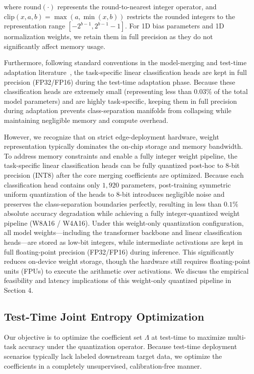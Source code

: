 where $\text{round}(\cdot)$ represents the round-to-nearest integer operator, and $\text{clip}(x, a, b) = \max(a, \min(x, b))$ restricts the rounded integers to the representation range $[-2^{b-1}, 2^{b-1}-1]$. For 1D bias parameters and 1D normalization weights, we retain them in full precision as they do not significantly affect memory usage.

Furthermore, following standard conventions in the model-merging and test-time adaptation literature~\cite{ilharco2022editing, yang2024adamerging}, the task-specific linear classification heads are kept in full precision (FP32/FP16) during the test-time adaptation phase. Because these classification heads are extremely small (representing less than 0.03\% of the total model parameters) and are highly task-specific, keeping them in full precision during adaptation prevents class-separation manifolds from collapsing while maintaining negligible memory and compute overhead. 

However, we recognize that on strict edge-deployment hardware, weight representation typically dominates the on-chip storage and memory bandwidth. To address memory constraints and enable a fully integer weight pipeline, the task-specific linear classification heads can be fully quantized post-hoc to 8-bit precision (INT8) after the core merging coefficients are optimized. Because each classification head contains only $1,920$ parameters, post-training symmetric uniform quantization of the heads to 8-bit introduces negligible noise and preserves the class-separation boundaries perfectly, resulting in less than $0.1\%$ absolute accuracy degradation while achieving a fully integer-quantized weight pipeline (W8A16 / W4A16). Under this weight-only quantization configuration, all model weights—including the transformer backbone and linear classification heads—are stored as low-bit integers, while intermediate activations are kept in full floating-point precision (FP32/FP16) during inference. This significantly reduces on-device weight storage, though the hardware still requires floating-point units (FPUs) to execute the arithmetic over activations. We discuss the empirical feasibility and latency implications of this weight-only quantized pipeline in Section 4.

\subsection{Test-Time Joint Entropy Optimization}
Our objective is to optimize the coefficient set $\Lambda$ at test-time to maximize multi-task accuracy under the quantization operator. Because test-time deployment scenarios typically lack labeled downstream target data, we optimize the coefficients in a completely unsupervised, calibration-free manner. 

